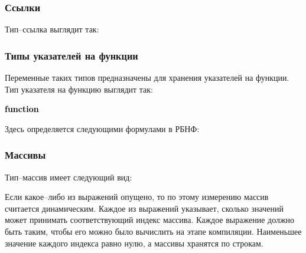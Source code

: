 \documentclass[10pt]{report}
\begin{document}
        \subsubsection{Ссылки}
Тип--ссылка выглядит так:        
\begin{center}
\noindent\textcolor{Green}{}
\end{center}
        
        \subsubsection{Типы указателей на функции}

Переменные таких типов предназначены для хранения указателей на функции. Тип указателя на функцию выглядит так:
\begin{center}
\noindent\textcolor{Green}{\textcolor{Black}{\textbf{function}}  }
\end{center}

Здесь \textcolor{Green}{} определяется следующими формулами в РБНФ:

\textcolor{Green}{}

        \subsubsection{Массивы}
Тип--массив имеет следующий вид:
\begin{center}
\noindent\textcolor{Green}{}
\end{center}


Если какое--либо из выражений опущено, то по этому измерению массив считается динамическим. Каждое из выражений указывает, сколько значений может принимать соответствующий
индекс массива. Каждое выражение должно быть таким, чтобы его можно было вычислить на этапе компиляции. Наименьшее значение каждого индекса равно нулю, а массивы хранятся по
строкам.
\end{document}
